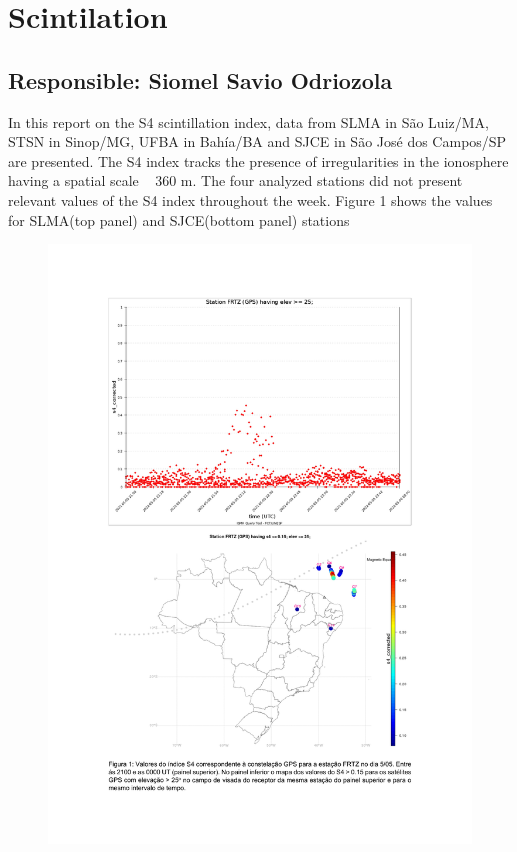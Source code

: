 \documentclass[a4paper, 10pt]{article}
\begin{document}
\section{Scintilation} 
 \subsection{Responsible: Siomel Savio Odriozola} 
 
In this report on the S4 scintillation index, data from SLMA in São Luiz/MA, STSN 
in Sinop/MG, UFBA in Bahía/BA and SJCE in São José dos Campos/SP are 
presented. The S4 index tracks the presence of irregularities in the ionosphere 
having a spatial scale ~ 360 m. 
The four analyzed stations did not present relevant values of the S4 index 
throughout the week. Figure 1 shows the values for SLMA(top panel) and 
SJCE(bottom panel) stations 

    \begin{figure}[H]
        \centering
        \includegraphics[width=14cm]{./figures/en_outfileScint_0.jpg}
    \end{figure} 
 

    
\end{document}
